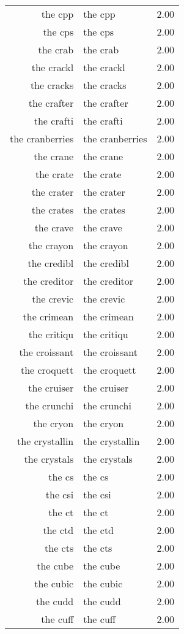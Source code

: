 \begin{table}[ht]
\begin{tabular}{rlr}
  the cpp & the cpp & 2.00 \\ 
  the cps & the cps & 2.00 \\ 
  the crab & the crab & 2.00 \\ 
  the crackl & the crackl & 2.00 \\ 
  the cracks & the cracks & 2.00 \\ 
  the crafter & the crafter & 2.00 \\ 
  the crafti & the crafti & 2.00 \\ 
  the cranberries & the cranberries & 2.00 \\ 
  the crane & the crane & 2.00 \\ 
  the crate & the crate & 2.00 \\ 
  the crater & the crater & 2.00 \\ 
  the crates & the crates & 2.00 \\ 
  the crave & the crave & 2.00 \\ 
  the crayon & the crayon & 2.00 \\ 
  the credibl & the credibl & 2.00 \\ 
  the creditor & the creditor & 2.00 \\ 
  the crevic & the crevic & 2.00 \\ 
  the crimean & the crimean & 2.00 \\ 
  the critiqu & the critiqu & 2.00 \\ 
  the croissant & the croissant & 2.00 \\ 
  the croquett & the croquett & 2.00 \\ 
  the cruiser & the cruiser & 2.00 \\ 
  the crunchi & the crunchi & 2.00 \\ 
  the cryon & the cryon & 2.00 \\ 
  the crystallin & the crystallin & 2.00 \\ 
  the crystals & the crystals & 2.00 \\ 
  the cs & the cs & 2.00 \\ 
  the csi & the csi & 2.00 \\ 
  the ct & the ct & 2.00 \\ 
  the ctd & the ctd & 2.00 \\ 
  the cts & the cts & 2.00 \\ 
  the cube & the cube & 2.00 \\ 
  the cubic & the cubic & 2.00 \\ 
  the cudd & the cudd & 2.00 \\ 
  the cuff & the cuff & 2.00 \\ 

\end{tabular}
\end{table}
